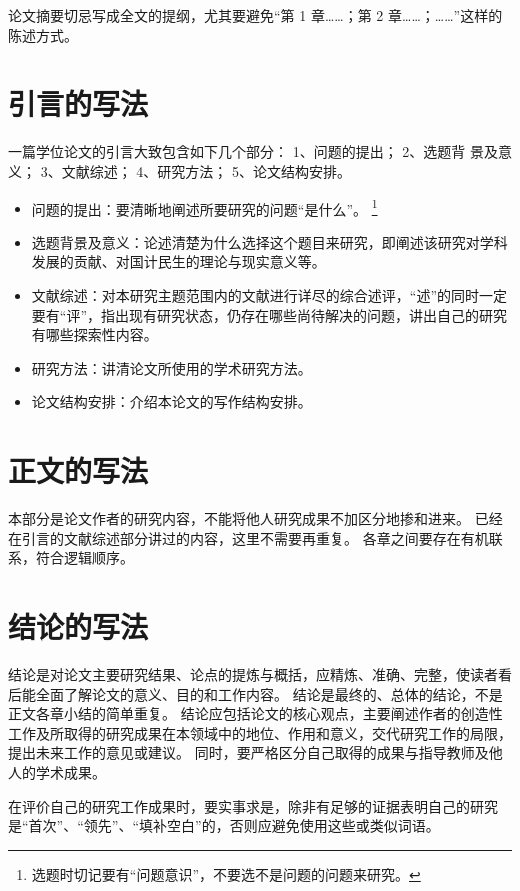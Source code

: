 论文摘要切忌写成全文的提纲，尤其要避免“第 1 章……；第 2 章……；……”这样的陈述方式。

\section{引言的写法}

一篇学位论文的引言大致包含如下几个部分：
1、问题的提出；
2、选题背 景及意义；
3、文献综述；
4、研究方法；
5、论文结构安排。
\begin{itemize}
  \item 问题的提出：要清晰地阐述所要研究的问题“是什么”。
    \footnote{选题时切记要有“问题意识”，不要选不是问题的问题来研究。}
  \item 选题背景及意义：论述清楚为什么选择这个题目来研究，即阐述该研究对学科发展的贡献、对国计民生的理论与现实意义等。
  \item 文献综述：对本研究主题范围内的文献进行详尽的综合述评，“述”的同时一定要有“评”，指出现有研究状态，仍存在哪些尚待解决的问题，讲出自己的研究有哪些探索性内容。
  \item 研究方法：讲清论文所使用的学术研究方法。
  \item 论文结构安排：介绍本论文的写作结构安排。
\end{itemize}

\section{正文的写法}

本部分是论文作者的研究内容，不能将他人研究成果不加区分地掺和进来。
已经在引言的文献综述部分讲过的内容，这里不需要再重复。
各章之间要存在有机联系，符合逻辑顺序。

\section{结论的写法}

结论是对论文主要研究结果、论点的提炼与概括，应精炼、准确、完整，使读者看后能全面了解论文的意义、目的和工作内容。
结论是最终的、总体的结论，不是正文各章小结的简单重复。
结论应包括论文的核心观点，主要阐述作者的创造性工作及所取得的研究成果在本领域中的地位、作用和意义，交代研究工作的局限，提出未来工作的意见或建议。
同时，要严格区分自己取得的成果与指导教师及他人的学术成果。

在评价自己的研究工作成果时，要实事求是，除非有足够的证据表明自己的研究是“首次”、“领先”、“填补空白”的，否则应避免使用这些或类似词语。
